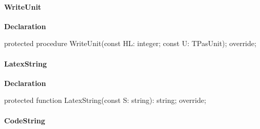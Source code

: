 \documentclass{report}
\newif\ifpdf
\begin{document}
\paragraph*{WriteUnit}\hspace*{\fill}

\label{PasDoc_GenLatex.TTexDocGenerator-WriteUnit}
\begin{list}{}{
\setlength{\itemindent}{0cm}
\setlength{\listparindent}{0cm}
\setlength{\leftmargin}{\evensidemargin}
\addtolength{\leftmargin}{\tmplength}
\settowidth{\labelsep}{X}
\addtolength{\leftmargin}{\labelsep}
\setlength{\labelwidth}{\tmplength}
}
\item[\textbf{Declaration}\hfill]
\ifpdf
\begin{flushleft}
\fi
\begin{ttfamily}
protected procedure WriteUnit(const HL: integer; const U: TPasUnit); override;\end{ttfamily}

\ifpdf
\end{flushleft}
\fi

\end{list}
\paragraph*{LatexString}\hspace*{\fill}

\label{PasDoc_GenLatex.TTexDocGenerator-LatexString}
\begin{list}{}{
\setlength{\itemindent}{0cm}
\setlength{\listparindent}{0cm}
\setlength{\leftmargin}{\evensidemargin}
\addtolength{\leftmargin}{\tmplength}
\settowidth{\labelsep}{X}
\addtolength{\leftmargin}{\labelsep}
\setlength{\labelwidth}{\tmplength}
}
\item[\textbf{Declaration}\hfill]
\ifpdf
\begin{flushleft}
\fi
\begin{ttfamily}
protected function LatexString(const S: string): string; override;\end{ttfamily}

\ifpdf
\end{flushleft}
\fi

\end{list}
\paragraph*{CodeString}\hspace*{\fill}
\end{document}
